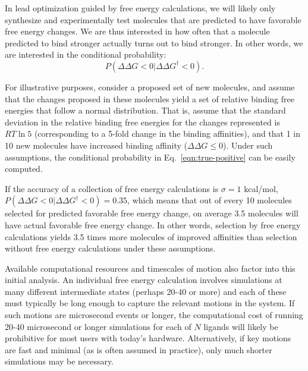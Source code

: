 \documentclass[9pt,bestpractices]{livecoms}
\begin{document}
In lead optimization guided by free energy calculations, we will likely only
synthesize and experimentally test molecules that are predicted to
have favorable free energy changes. We are thus interested in how
often that a molecule predicted to bind stronger actually turns out to
bind stronger. In other words, we are interested in the conditional
probability:
\begin{equation}
  P(\Delta\Delta G<0|\Delta\Delta G^\dagger<0).
  \label{eqn:true-positive}
\end{equation}

For illustrative purposes, consider a proposed set of new molecules, and assume that the changes proposed in these molecules yield a set of relative binding free energies that follow a normal
distribution. That is, assume that the standard deviation in the relative binding free energies for the changes represented is $RT\ln 5$
(corresponding to a 5-fold change in the binding affinities), and that
1 in 10 new molecules have increased binding affinity ($\Delta\Delta G
\leq 0$). Under such assumptions, the conditional probability in
Eq.~\ref{eqn:true-positive} can be easily computed. 

If the accuracy of a collection of free energy calculations is $\sigma = 1$ kcal/mol, $P(\Delta\Delta
G<0|\Delta\Delta G^\dagger<0) = 0.35$, which means that out of every
10 molecules selected for predicted favorable free energy change, on
average 3.5 molecules will have actual favorable free energy change.
In other words, selection by free energy calculations yields 3.5 times
more molecules of improved affinities than selection without free
energy calculations under these assumptions.
  
Available computational resources and timescales of motion also factor
into this initial analysis. An individual free energy calculation
involves simulations at many different intermediate states (perhaps
20-40 or more) and each of these must typically be long enough to
capture the relevant motions in the system. If such motions are
microsecond events or longer, the computational cost of running 20-40
microsecond or longer simulations for each of $N$ ligands will likely be
prohibitive for most users with today's hardware. Alternatively, if key motions are fast and minimal (as is often assumed in practice), only much shorter simulations may be necessary. 
\end{document}
